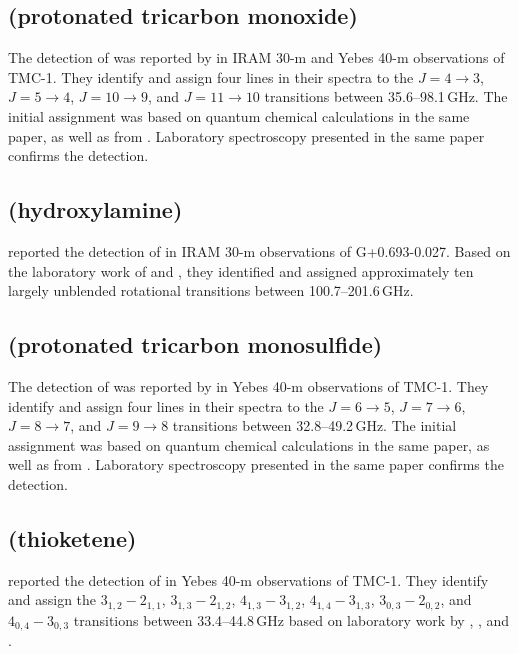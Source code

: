 \documentclass[twocolumn]{aastex631}
\newcommand{\update}[1]{{#1}}
\begin{document}
	\subsection{\update{ (protonated tricarbon monoxide)}}
	\label{HC3O+}
	
	\update{The detection of  was reported by \citet{Cernicharo:2020dj} in IRAM 30-m and Yebes 40-m observations of TMC-1.  They identify and assign four lines in their spectra to the $J = 4\rightarrow3$, $J = 5\rightarrow4$, $J = 10\rightarrow9$, and $J = 11\rightarrow10$ transitions between {35.6--98.1}\,GHz.  The initial assignment was based on quantum chemical calculations in the same paper, as well as from \citet{Thorwirth:2020ci}.   Laboratory spectroscopy presented in the same paper confirms the detection.}
	
	\subsection{\update{ (hydroxylamine)}}
	\label{NH2OH}
	
	\update{\citet{Rivilla:2020eb} reported the detection of \ce{NH2OH} in IRAM 30-m observations of G+0.693-0.027.  Based on the laboratory work of \citet{Tsunekawa:1972op} and \citet{Morino:2000ff}, they identified and assigned approximately ten largely unblended rotational transitions between 100.7--201.6\,GHz.}
	
	\subsection{\update{ (protonated tricarbon monosulfide)}}
	\label{HC3S+}
	
	\update{The detection of  was reported by \citet{Cernicharo:2021pd} in Yebes 40-m observations of TMC-1.  They identify and assign four lines in their spectra to the $J = 6\rightarrow5$, $J = 7\rightarrow6$, $J = 8\rightarrow7$, and $J = 9\rightarrow8$ transitions between 32.8--49.2\,GHz.  The initial assignment was based on quantum chemical calculations in the same paper, as well as from \citet{Thorwirth:2020ci}.   Laboratory spectroscopy presented in the same paper confirms the detection.}
	
	\subsection{\update{ (thioketene)}}
	\label{H2CCS}
	
	\update{\citet{Cernicharo:2021ke} reported the detection of \ce{H2CCS} in Yebes 40-m observations of TMC-1.  They identify and assign the $3_{1,2} - 2_{1,1}$, $3_{1,3} - 2_{1,2}$, $4_{1,3} - 3_{1,2}$, $4_{1,4} - 3_{1,3}$, $3_{0,3} - 2_{0,2}$, and $4_{0,4} - 3_{0,3}$ transitions between 33.4--44.8\,GHz based on laboratory work by \citet{Georgiou:1979kl}, \citet{Winnewisser:1980ic}, and \citet{1996JMoSp.175..377M}.}	
	
\end{document}

